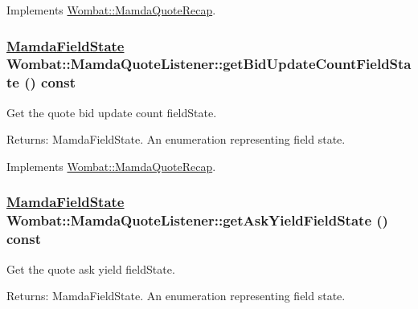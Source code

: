 Implements \hyperlink{classWombat_1_1MamdaQuoteRecap_c9fddc7ecb8d6b3cccd075b95917d2e2}{Wombat::Mamda\-Quote\-Recap}.\hypertarget{classWombat_1_1MamdaQuoteListener_94564b543817c0a2c9a0711ae7e63ad5}{
\subsubsection[getBidUpdateCountFieldState]{\setlength{\rightskip}{0pt plus 5cm}\hyperlink{namespaceWombat_93aac974f2ab713554fd12a1fa3b7d2a}{Mamda\-Field\-State} Wombat::Mamda\-Quote\-Listener::get\-Bid\-Update\-Count\-Field\-State () const}}
\label{classWombat_1_1MamdaQuoteListener_94564b543817c0a2c9a0711ae7e63ad5}


Get the quote bid update count field\-State. 

\begin{Desc}
\item[Returns:]Mamda\-Field\-State. An enumeration representing field state. \end{Desc}


Implements \hyperlink{classWombat_1_1MamdaQuoteRecap_a1fde4201397013b41115b90913c4f06}{Wombat::Mamda\-Quote\-Recap}.\hypertarget{classWombat_1_1MamdaQuoteListener_94700f1e9995a69f5005efce5dc368d1}{
\subsubsection[getAskYieldFieldState]{\setlength{\rightskip}{0pt plus 5cm}\hyperlink{namespaceWombat_93aac974f2ab713554fd12a1fa3b7d2a}{Mamda\-Field\-State} Wombat::Mamda\-Quote\-Listener::get\-Ask\-Yield\-Field\-State () const}}
\label{classWombat_1_1MamdaQuoteListener_94700f1e9995a69f5005efce5dc368d1}


Get the quote ask yield field\-State. 

\begin{Desc}
\item[Returns:]Mamda\-Field\-State. An enumeration representing field state. \end{Desc}


